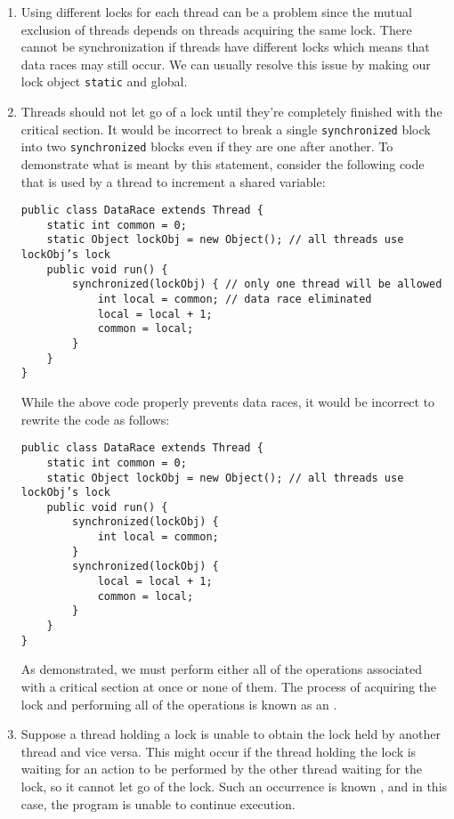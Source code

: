 \begin{enumerate}
    \item Using different locks for each thread can be a problem since the mutual exclusion of threads depends on threads acquiring the same lock. There cannot be synchronization if threads have different locks which means that data races may still occur. We can usually resolve this issue by making our lock object \verb!static! and global.
    \item Threads should not let go of a lock until they're completely finished with the critical section. It would be incorrect to break a single \verb!synchronized! block into two \verb!synchronized! blocks even if they are one after another. To demonstrate what is meant by this statement, consider the following code that is used by a thread to increment a shared variable:
\begin{lstlisting}
public class DataRace extends Thread {
    static int common = 0;
    static Object lockObj = new Object(); // all threads use lockObj’s lock
    public void run() {
        synchronized(lockObj) { // only one thread will be allowed
            int local = common; // data race eliminated
            local = local + 1;
            common = local;
        }
    }
}
\end{lstlisting}
    While the above code properly prevents data races, it would be incorrect to rewrite the code as follows:
    \begin{lstlisting}
public class DataRace extends Thread {
    static int common = 0;
    static Object lockObj = new Object(); // all threads use lockObj’s lock
    public void run() {
        synchronized(lockObj) { 
            int local = common; 
        }
        synchronized(lockObj) {
            local = local + 1;
            common = local;
        }
    }
}
\end{lstlisting}
    As demonstrated, we must perform either all of the operations associated with a critical section at once or none of them. The process of acquiring the lock and performing all of the operations is known as an . 
    \item Suppose a thread holding a lock is unable to obtain the lock held by another thread and vice versa. This might occur if the thread holding the lock is waiting for an action to be performed by the other thread waiting for the lock, so it cannot let go of the lock. Such an occurrence is known , and in this case, the program is unable to continue execution.
\end{enumerate}